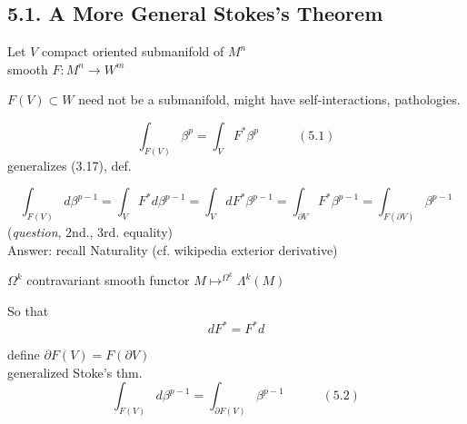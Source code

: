 \subsection{ 5.1. A More General Stokes's Theorem}

Let $V$ compact oriented submanifold of $M^n$ \\
smooth $F: M^n \to W^m$ 

$F(V) \subset W$ need not be a submanifold, might have self-interactions, pathologies.  

\begin{equation}
        \int_{F(V)} \beta^p = \int_V F^* \beta^p  \quad \quad \quad (5.1)
\end{equation}
generalizes (3.17), def. 

\[
\int_{F(V)} d\beta^{p-1} = \int_V F^* d\beta^{p-1} = \int_V dF^* \beta^{p-1} = \int_{ \partial V} F^* \beta^{p-1} = \int_{ F(\partial V)} \beta^{p-1}
\]
(\emph{question}, 2nd., 3rd. equality) \\

Answer: recall Naturality (cf. wikipedia exterior derivative)

$\Omega^k$ contravariant smooth functor $M \mapsto^{ \Omega^k } \Lambda^k(M)$


So that 
\[
dF^* = F^* d
\]

 \hrulefill

define $\partial F(V) = F( \partial V)$ \\

generalized Stoke's thm.
\begin{equation}
        \int_{F(V)} d\beta^{p-1} = \int_{ \partial F(V)} \beta^{p-1} \quad \quad \quad (5.2)
\end{equation}

